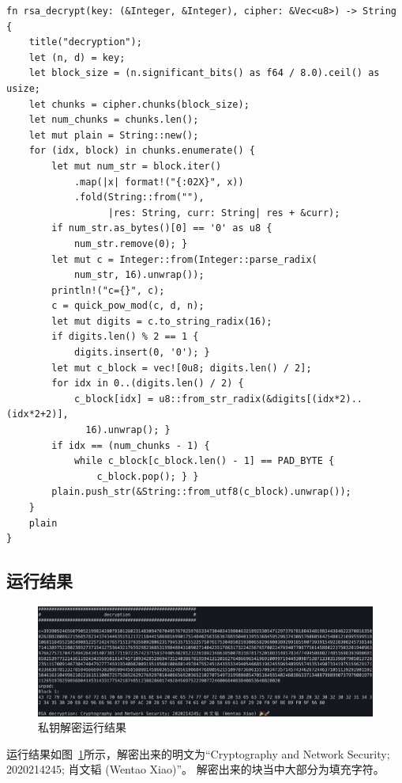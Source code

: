 \documentclass[degree=project,degree-type=project,cjk-font=windows]{thuthesis}
\begin{document}
  \begin{verbatim}
fn rsa_decrypt(key: (&Integer, &Integer), cipher: &Vec<u8>) -> String {
    title("decryption");
    let (n, d) = key;
    let block_size = (n.significant_bits() as f64 / 8.0).ceil() as usize;
    let chunks = cipher.chunks(block_size);
    let num_chunks = chunks.len();
    let mut plain = String::new();
    for (idx, block) in chunks.enumerate() {
        let mut num_str = block.iter()
            .map(|x| format!("{:02X}", x))
            .fold(String::from(""),
                  |res: String, curr: String| res + &curr);
        if num_str.as_bytes()[0] == '0' as u8 {
            num_str.remove(0); }
        let mut c = Integer::from(Integer::parse_radix(
            num_str, 16).unwrap());
        println!("c={}", c);
        c = quick_pow_mod(c, d, n);
        let mut digits = c.to_string_radix(16);
        if digits.len() % 2 == 1 {
            digits.insert(0, '0'); }
        let mut c_block = vec![0u8; digits.len() / 2];
        for idx in 0..(digits.len() / 2) {
            c_block[idx] = u8::from_str_radix(&digits[(idx*2)..(idx*2+2)],
              16).unwrap(); }
        if idx == (num_chunks - 1) {
            while c_block[c_block.len() - 1] == PAD_BYTE {
                c_block.pop(); } }
        plain.push_str(&String::from_utf8(c_block).unwrap());
    }
    plain
}
\end{verbatim}

\subsection{运行结果}

\begin{figure}[h]
\centering%
\includegraphics[width=\linewidth]{rsa_t3.png}
  \caption{私钥解密运行结果}
  \label{fig:t3}
\end{figure}

运行结果如图~\ref{fig:t3}所示，解密出来的明文为“Cryptography and Network Security; 2020214245; 肖文韬 (Wentao Xiao)”。
解密出来的块当中大部分为填充字符。
\end{document}
